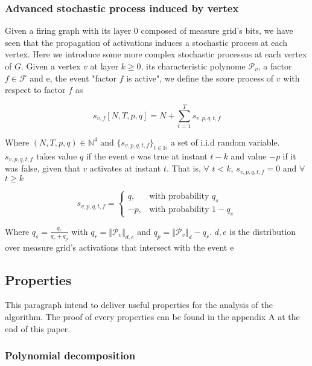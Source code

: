 \documentclass[a4paper, 11pt]{article}
\begin{document}
\subsubsection*{Advanced stochastic process induced by vertex}

Given a firing graph with its layer 0 composed of measure grid's bits, we have seen that the propagation of activations induces a stochastic process at each vertex. Here we introduce some more complex stochastic processus at each vertex of $G$. Given a vertex $v$ at layer $k \geq 0$, its  characteristic polynome $\mathcal{P}_{v}$, a factor $f \in \mathcal{F}$ and e, the event "factor $f$ is active", we define the score process of $v$ with respect to factor $f$ as

\begin{equation*}
s_{v,f}\left[N, T, p, q \right] = N + \sum_{t=1}^{T} s_{v, p, q, t, f}
\end{equation*}

Where $(N, T, p, q) \in \mathbb{N}^4$ and $\lbrace s_{v, p, q, t, f} \rbrace_{t \in \mathbb{N}}$ a set of i.i.d random variable. $s_{v, p, q, t, f}$ takes value $q$ if the event e was true at instant $t - k $ and value $-p$ if it was false, given that $v$ activates at instant $t$. That is, $\forall$ $t  < k $, $s_{v, p, q,t, f} = 0$ and $\forall$ $t  \geq k$

\begin{equation*}
s_{v, p,q, t, f} = \begin{cases} q, & \text{with probability } q_s  \\ -p, & \text{with probability } 1 - q_s \end{cases}
\end{equation*}

Where $q_s = \frac{q_r}{q_r + q_p}$ with $q_r = \Vert \mathcal{P}_v \Vert_{d,e} $ and $q_p = \Vert \mathcal{P}_v \Vert_{d} - q_r$.  $d, e$ is the distribution over measure grid's activations that intersect with the event e

\subsection{Properties}

This paragraph intend to deliver useful properties for the analysis of the algorithm. The proof of every properties can be found in the appendix A at the end of this paper.

\subsubsection*{Polynomial decomposition}
\end{document}

